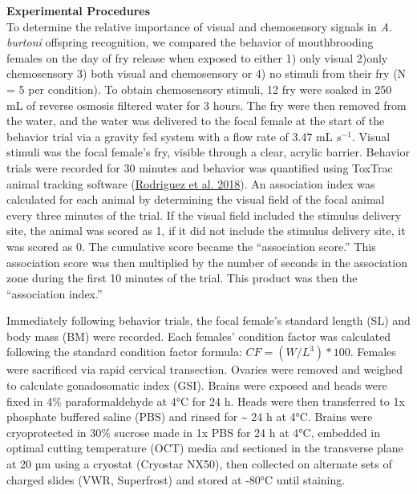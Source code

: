 \documentclass[
  12pt,
]{article}
\begin{document}
\textbf{Experimental Procedures}\\
To determine the relative importance of visual and chemosensory signals in \emph{A. burtoni} offspring recognition, we compared the behavior of mouthbrooding females on the day of fry release when exposed to either 1) only visual 2)only chemosensory 3) both visual and chemosensory or 4) no stimuli from their fry (N = 5 per condition). To obtain chemosensory stimuli, 12 fry were soaked in 250 mL of reverse osmosis filtered water for 3 hours. The fry were then removed from the water, and the water was delivered to the focal female at the start of the behavior trial via a gravity fed system with a flow rate of 3.47 mL \(s^{-1}\). Visual stimuli was the focal female's fry, visible through a clear, acrylic barrier. Behavior trials were recorded for 30 minutes and behavior was quantified using ToxTrac animal tracking software (\protect\hyperlink{ref-RN16}{Rodriguez et al. 2018}). An association index was calculated for each animal by determining the visual field of the focal animal every three minutes of the trial. If the visual field included the stimulus delivery site, the animal was scored as 1, if it did not include the stimulus delivery site, it was scored as 0. The cumulative score became the ``association score.'' This association score was then multiplied by the number of seconds in the association zone during the first 10 minutes of the trial. This product was then the ``association index.''

Immediately following behavior trials, the focal female's standard length (SL) and body mass (BM) were recorded. Each females' condition factor was calculated following the standard condition factor formula: \(CF = (W/L^3)*100\). Females were sacrificed via rapid cervical transection. Ovaries were removed and weighed to calculate gonadosomatic index (GSI). Brains were exposed and heads were fixed in 4\% paraformaldehyde at 4°C for 24 h. Heads were then transferred to 1x phosphate buffered saline (PBS) and rinsed for \textasciitilde{} 24 h at 4°C. Brains were cryoprotected in 30\% sucrose made in 1x PBS for 24 h at 4°C, embedded in optimal cutting temperature (OCT) media and sectioned in the transverse plane at 20 µm using a cryostat (Cryostar NX50), then collected on alternate sets of charged slides (VWR, Superfrost) and stored at -80°C until staining.
\end{document}
